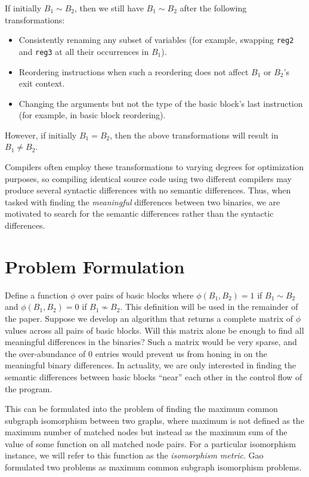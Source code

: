 \documentclass[11pt,twocolumn]{article}
\begin{document}
If initially $B_1 \sim B_2$, then we still have $B_1 \sim B_2$ after the following transformations: 
\begin{itemize}
\item Consistently renaming any subset of variables (for example, swapping \texttt{reg2} and \texttt{reg3} at all their occurrences in $B_1$).
\item Reordering instructions when such a reordering does not affect $B_1$ or $B_2$'s exit context.
\item Changing the arguments but not the type of the basic block's last instruction (for example, in basic block reordering). 
\end{itemize}
However, if initially $B_1 = B_2$, then the above transformations will result in $B_1 \neq B_2$.

Compilers often employ these transformations to varying degrees for optimization purposes, so compiling identical source code using two different compilers may produce several syntactic differences with no semantic differences.
Thus, when tasked with finding the \emph{meaningful} differences between two binaries, we are motivated to search for the semantic differences rather than the syntactic differences.

\section{Problem Formulation}

Define a function $\phi$ over pairs of basic blocks where  $\phi(B_1,B_2)=1$ if $B_1 \sim B_2$ and $\phi(B_1,B_2)=0$ if $B_1 \not \sim B_2$.   This definition will be used in the remainder of the paper.  Suppose we develop an algorithm that returns a complete matrix of $\phi$ values across all pairs of basic blocks.  Will this matrix alone be enough to find all meaningful differences in the binaries? Such a matrix would be very sparse, and the over-abundance of 0 entries would prevent us from honing in on the meaningful binary differences.  In actuality, we are only interested in finding the semantic differences between basic blocks ``near'' each other in the control flow of the program.

This can be formulated into the problem of finding the maximum common subgraph isomorphism between two graphs, where maximum is not defined as the maximum number of matched nodes but instead as the maximum sum of the value of some function on all matched node pairs.  For a particular isomorphism instance, we will refer to this function as the \emph{isomorphism metric}.  Gao formulated two problems as maximum common subgraph isomorphism problems.
\end{document}
